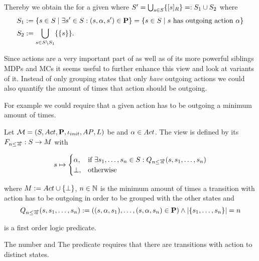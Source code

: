 \documentclass[preview]{standalone}
\begin{document}
Thereby we obtain the \viewN \viewhasoutaction for a given \chosengraphtypeN \chgph where ${S}' = \bigcup_{{s} \in {S}} \{{{[{s}]_{{R}}}}\} =: {S}_1 \cup {S}_2$ where
\begin{align*}
	 {S}_1 &:= \{{s} \in {S} \mid \exists {s}' \in {S}: ({s}, {\alpha}, {s}') \in {\ensuremath{{\textbf{P}}}}\} = \{{s} \in {S} \mid {s} \text{ has outgoing action \ensuremath{{\alpha}}}\} \\
	{S}_2 &:= {\bigcup_{{s} \in {S} \setminus {S}_1}\{\{{s}\}\}}.
\end{align*}


Since actions are a very important part of \chosengraphtypesN as well as of its more powerful siblings MDPs and MCs it seems useful to further enhance this view and look at variants of it. Instead of only grouping states that only \emph{have} outgoing actions we could also quantify the amount of times that action should be outgoing.

For example we could require that a given action has to be outgoing a minimum amount of times. 

\begin{definition}
	Let ${{{\mathcal{M}}}} = {{({S}, {Act}, {\textbf{P}}, {\iota_{init}}, {AP}, {L})}}$ be \chosengraphtypeN and ${\alpha} \in {Act}$. The view \viewminoutaction is defined by its \grpfctN ${{F_{{n}\leq{\overrightarrow{\ensuremath{{\alpha}}}}}}} : {S} \to {M}$ with
	
	\[
	{s} \mapsto
	\begin{cases}
		{\alpha},				& \text{if } \exists {s}_1, \dots, {s}_{n} \in {S}:  {Q_{{n}\leq{\overrightarrow{\ensuremath{{\alpha}}}}}({s},{s}_1, \dots, {s}_{{n}})}\\
		{\bot},          	& \text{otherwise}
	\end{cases}
	\]
	
	where ${{M}} := {{Act} \cup {\{\bot\}}}$, ${n} \in {\mathbb{N}}$ is the minimum amount of times a transition with action \action has to be outgoing in order to be grouped with the other states and
	\[
	{Q_{{n}\leq{\overrightarrow{\ensuremath{{\alpha}}}}}({s},{s}_1, \dots, {s}_{{n}})} := (({s}, {\alpha}, {s}_1), \dots, ({s}, {\alpha}, {s}_{n}) \in {\ensuremath{{\textbf{P}}}}) \land |\{{s}_1, \dots, {s}_{n}\}| = {n}
	\]
	
	is a first order logic predicate.
	\label{def:minoutaction}
\end{definition}

The number  and  
The predicate \predminoutact requires that there are transitions with action \action to \numoutact distinct states.
\end{document}
